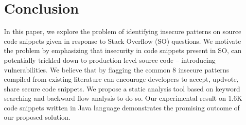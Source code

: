 \section{Conclusion}
\label{sec:conclusion}
In this paper, we explore the problem of  identifying insecure patterns on source code snippets given in response to Stack Overflow (SO) questions.  
We motivate the problem by emphasizing that insecurity in code snippets present in SO, 
can potentially trickled down to production level source code -- introducing vulnerabilities.
We believe that by flagging the common 8 insecure patterns compiled from existing literature 
can encourage developers to accept, updvote, share secure code snippets. 
We propose a static analysis tool based on keyword searching and backward flow
analysis to do so. Our experimental result on 1.6K code snippets written in Java language
demonstrates the promising outcome of our proposed solution.  



